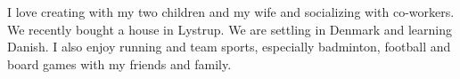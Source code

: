 

I love creating with my two children and my wife and socializing with co-workers. We recently bought a house in Lystrup. We are settling in Denmark and learning Danish. I also enjoy running and team sports, especially badminton, football and board games with my friends and family.  
